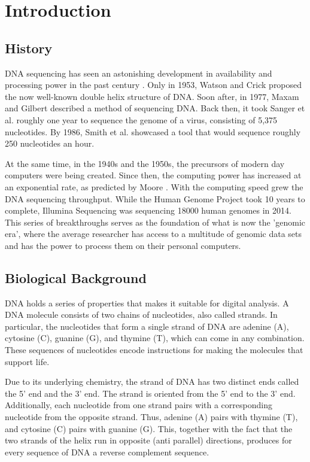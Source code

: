 \documentclass[12pt]{article}
\begin{document}
\newpage
\section{Introduction}


\subsection{History}
DNA  sequencing has seen an astonishing development in availability and processing power in the past century
\cite{Hood2003}. Only in 1953, Watson and Crick \cite{WATSON1953} proposed the now well-known double helix structure of DNA. Soon after, in 1977, Maxam and Gilbert \cite{Maxam1977} described a method of sequencing DNA. Back then, it took Sanger et al. \cite{Sanger1977} roughly one year to sequence the genome of a virus, consisting of 5,375 nucleotides. By 1986, Smith et al. \cite{Smith1986} showcased a tool that would sequence roughly 250 nucleotides an hour. 

At the same time, in the 1940s and the 1950s, the precursors of modern day computers were being created. Since then, the computing power has increased at an exponential rate, as predicted by Moore \cite{Moore2006}. With the computing speed grew the DNA sequencing throughput. While the Human Genome Project took 10 years to complete, Illumina Sequencing \cite{illuminaSeq} was sequencing 18000 human genomes in 2014. This series of breakthroughs serves as the foundation of what is now the 'genomic era', where the average researcher has access to a multitude of genomic data sets and has the power to process them on their personal computers.   

\subsection{Biological Background}
DNA holds a series of properties that makes it suitable for digital analysis. A DNA molecule consists of two chains of nucleotides, also called strands. In particular, the nucleotides that form a single strand of DNA are adenine (A), cytosine (C), guanine (G), and thymine (T), which can come in any combination. These sequences of nucleotides  encode instructions for making the molecules that support life. 


Due to its underlying chemistry, the strand of DNA has two distinct ends called the 5' end and the 3' end. The strand is oriented from the 5' end to the 3' end. Additionally, each nucleotide from one strand pairs with a corresponding nucleotide from the opposite strand. Thus, adenine (A) pairs with thymine (T), and cytosine (C) pairs with guanine (G). This, together with the fact that the two strands of the helix run in opposite (anti parallel) directions, produces for every sequence of DNA a reverse complement sequence. 
\end{document}
